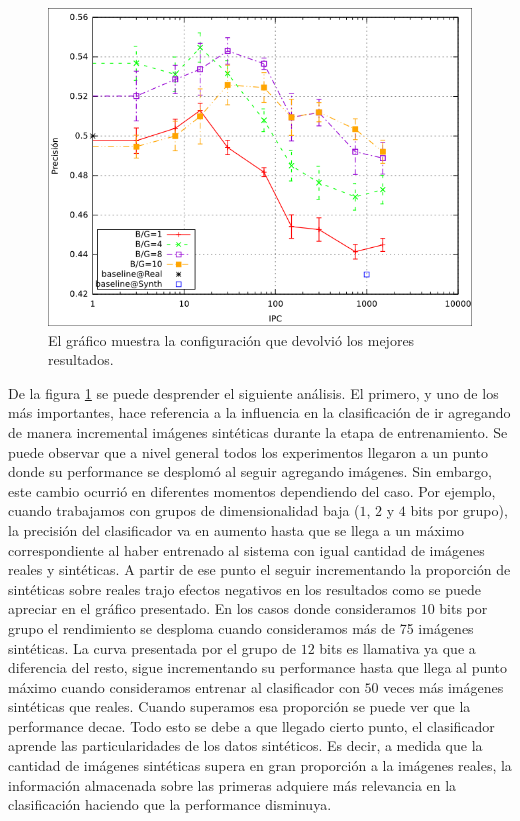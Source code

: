 			\begin{figure}[!htbp]
				\centering
				\centerline{
					\includegraphics[scale=0.6]{img/resultados/mixtas/best_mean_2040.png}
				}
				\caption[Mixtas media mejor resultado]{El gráfico muestra la configuración que devolvió los mejores resultados.}
				\label{fig: Mixtas-media-mejor}
			\end{figure}

	De la figura \ref{fig: Mixtas-media-mejor} se puede desprender el siguiente análisis. El primero, y uno de los más importantes, hace referencia a la influencia en la clasificación de ir agregando de manera incremental imágenes sintéticas durante la etapa de entrenamiento. Se puede observar que a nivel general todos los experimentos llegaron a un punto donde su performance se desplomó al seguir agregando imágenes. Sin embargo, este cambio ocurrió en diferentes momentos dependiendo del caso. Por ejemplo, cuando trabajamos con grupos de dimensionalidad baja ($1$, $2$ y $4$ bits por grupo), la precisión del clasificador va en aumento hasta que se llega a un máximo correspondiente al haber entrenado al sistema con igual cantidad de imágenes reales y sintéticas. A partir de ese punto el seguir incrementando la proporción de sintéticas sobre reales trajo efectos negativos en los resultados como se puede apreciar en el gráfico presentado. En los casos donde consideramos $10$ bits por grupo el rendimiento se desploma cuando consideramos más de 75 imágenes sintéticas. La curva presentada por el grupo de $12$ bits es llamativa ya que a diferencia del resto, sigue incrementando su performance hasta que llega al punto máximo cuando consideramos entrenar al clasificador con $50$ veces más imágenes sintéticas que reales. Cuando superamos esa proporción se puede ver que la performance decae. Todo esto se debe a que llegado cierto punto, el clasificador aprende las particularidades de los datos sintéticos. Es decir, a medida que la cantidad de imágenes sintéticas supera en gran proporción a la imágenes reales, la información almacenada sobre las primeras adquiere más relevancia en la clasificación haciendo que la performance disminuya.

